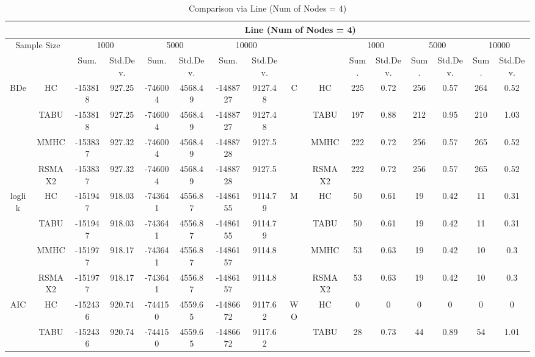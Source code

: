 \begin{table}[p]																										
\centering	\caption{Comparison via Line (Num of Nodes = 4)}	\tiny																						
{\tabcolsep=0.01in																										
\begin{tabular}{cc||cc|cc|cc||cc|cc|cc|cc}																										
\hline																										
&	&	\multicolumn{14}{c}{Line	(Num	of	Nodes	=	4)}\tabularnewline																			
\hline																										
\multicolumn{2}{c||}{Sample	Size}	&	\multicolumn{2}{c|}{1000}	&	\multicolumn{2}{c|}{5000}	&	\multicolumn{2}{c||}{10000}	&	&	&	\multicolumn{2}{c|}{1000}	&	\multicolumn{2}{c|}{5000}	&	\multicolumn{2}{c}{10000}\tabularnewline											
\hline																										
&	&	Sum.	&	Std.Dev.	&	Sum.	&	Std.Dev.	&	Sum.	&	Std.Dev.	&	&	&	Sum.	&	Std.Dev.	&	Sum.	&	Std.Dev.	&	Sum.	&	Std.Dev.\tabularnewline
\hline																										
\hline																										
\multirow{4}{*}{BDe} & HC &	-153818 & 	927.25 & 	-746004 & 	4568.49 & 	-1488727 & 	9127.48 & 	\multirow{4}{*}{C} & HC &	225 & 	0.72 & 	256 & 	0.57 & 	264 & 	0.52\tabularnewline													
& TABU &	-153818 & 	927.25 & 	-746004 & 	4568.49 & 	-1488727 & 	9127.48 & 	& TABU &	197 & 	0.88 & 	212 & 	0.95 & 	210 & 	1.03\tabularnewline													
& MMHC &	-153837 & 	927.32 & 	-746004 & 	4568.49 & 	-1488728 & 	9127.5 & 	& MMHC &	222 & 	0.72 & 	256 & 	0.57 & 	265 & 	0.52\tabularnewline													
& RSMAX2 &	-153837 & 	927.32 & 	-746004 & 	4568.49 & 	-1488728 & 	9127.5 & 	& RSMAX2 &	222 & 	0.72 & 	256 & 	0.57 & 	265 & 	0.52\tabularnewline													
\hline																										
\multirow{4}{*}{loglik} & HC &	-151947 & 	918.03 & 	-743641 & 	4556.87 & 	-1486155 & 	9114.79 & 	\multirow{4}{*}{M} & HC &	50 & 	0.61 & 	19 & 	0.42 & 	11 & 	0.31\tabularnewline													
& TABU &	-151947 & 	918.03 & 	-743641 & 	4556.87 & 	-1486155 & 	9114.79 & 	& TABU &	50 & 	0.61 & 	19 & 	0.42 & 	11 & 	0.31\tabularnewline													
& MMHC &	-151977 & 	918.17 & 	-743641 & 	4556.87 & 	-1486157 & 	9114.8 & 	& MMHC &	53 & 	0.63 & 	19 & 	0.42 & 	10 & 	0.3\tabularnewline													
& RSMAX2 &	-151977 & 	918.17 & 	-743641 & 	4556.87 & 	-1486157 & 	9114.8 & 	& RSMAX2 &	53 & 	0.63 & 	19 & 	0.42 & 	10 & 	0.3\tabularnewline													
\hline																										
\multirow{4}{*}{AIC} & HC &	-152436 & 	920.74 & 	-744150 & 	4559.65 & 	-1486672 & 	9117.62 & 	\multirow{4}{*}{WO} & HC &	0 & 	0 & 	0 & 	0 & 	0 & 	0\tabularnewline													
& TABU &	-152436 & 	920.74 & 	-744150 & 	4559.65 & 	-1486672 & 	9117.62 & 	& TABU &	28 & 	0.73 & 	44 & 	0.89 & 	54 & 	1.01\tabularnewline													

\end{tabular}}
\end{table}
